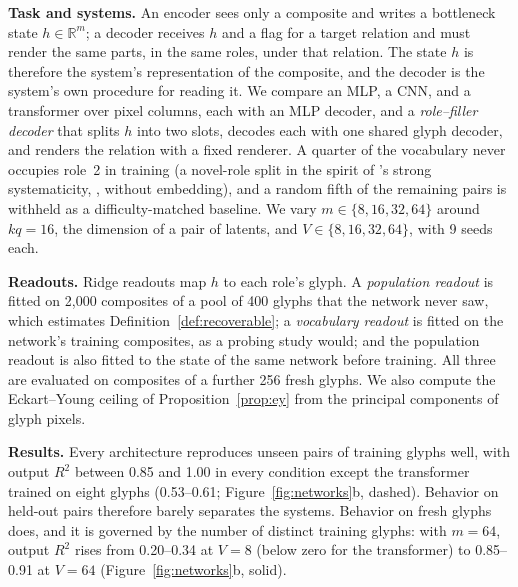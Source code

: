 \documentclass[10pt]{article}
\theoremstyle{plain}
\theoremstyle{remark}
\newcommand{\R}{\mathbb{R}}
\begin{document}
\textbf{Task and systems.} An encoder sees only a composite and writes a bottleneck state $h \in \R^m$; a decoder receives $h$ and a flag for a target relation and must render the same parts, in the same roles, under that relation. The state $h$ is therefore the system's representation of the composite, and the decoder is the system's own procedure for reading it. We compare an MLP, a CNN, and a transformer over pixel columns, each with an MLP decoder, and a \emph{role--filler decoder} that splits $h$ into two slots, decodes each with one shared glyph decoder, and renders the relation with a fixed renderer. A quarter of the vocabulary never occupies role~2 in training (a novel-role split in the spirit of \citeauthor{hadley1994}'s strong systematicity, \citeyear{hadley1994}, without embedding), and a random fifth of the remaining pairs is withheld as a difficulty-matched baseline. We vary $m \in \{8, 16, 32, 64\}$ around $kq = 16$, the dimension of a pair of latents, and $V \in \{8, 16, 32, 64\}$, with 9 seeds each.

\textbf{Readouts.} Ridge readouts map $h$ to each role's glyph. A \emph{population readout} is fitted on 2{,}000 composites of a pool of 400 glyphs that the network never saw, which estimates Definition~\ref{def:recoverable}; a \emph{vocabulary readout} is fitted on the network's training composites, as a probing study would; and the population readout is also fitted to the state of the same network before training. All three are evaluated on composites of a further 256 fresh glyphs. We also compute the Eckart--Young ceiling of Proposition~\ref{prop:ey} from the principal components of glyph pixels.

\textbf{Results.} Every architecture reproduces unseen pairs of training glyphs well, with output $R^2$ between 0.85 and 1.00 in every condition except the transformer trained on eight glyphs (0.53--0.61; Figure~\ref{fig:networks}b, dashed). Behavior on held-out pairs therefore barely separates the systems. Behavior on fresh glyphs does, and it is governed by the number of distinct training glyphs: with $m = 64$, output $R^2$ rises from 0.20--0.34 at $V = 8$ (below zero for the transformer) to 0.85--0.91 at $V = 64$ (Figure~\ref{fig:networks}b, solid).
\end{document}
